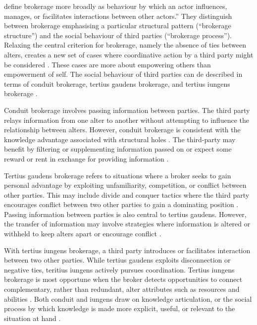 \citet{obstfeld2014brokerage} define brokerage more broadly as behaviour by which an actor influences, manages, or facilitates interactions between other actors.” They distinguish between brokerage emphasising a particular structural pattern (“brokerage structure”) and the social behaviour of third parties (“brokerage process”). Relaxing the central criterion for brokerage, namely the absence of ties between alters, creates a new set of cases where coordinative action by a third party might be considered \citep{obstfeld2014brokerage}. These cases are more about empowering others than empowerment of self. The social behaviour of third parties can de described in terms of conduit brokerage, tertius gaudens brokerage, and tertius iungens brokerage \citep{obstfeld2014brokerage}.\medskip

Conduit brokerage involves passing information between parties. The third party relays information from one alter to another without attempting to influence the relationship between alters. However, conduit brokerage is consistent with the knowledge advantage associated with structural holes \citep{burt1992structural}. The third-party may benefit by filtering or supplementing information passed on or expect some reward or rent in exchange for providing information \citep{obstfeld2014brokerage}. \medskip

Tertius gaudens brokerage refers to situations where a broker seeks to gain personal advantage by exploiting unfamiliarity, competition, or conflict between other parties. This may include divide and conquer tactics where the third party encourages conflict between two other parties to gain a dominating position \citep{simmel1950sociology,burt1992structural,obstfeld2014brokerage}. Passing information between parties is also central to tertius gaudens. However, the transfer of information may involve strategies where information is altered or withheld to keep alters apart or encourage conflict \citep{obstfeld2014brokerage}.\medskip

With tertius iungens brokerage, a third party introduces or facilitates interaction between two other parties. While tertius gaudens exploits disconnection or negative ties, teritius iungens actively pursues coordination. Tertius iungens brokerage is most opportune when the broker detects opportunities to connect complementary, rather than redundant, alter attributes such as resources and abilities \citep{obstfeld2014brokerage}. Both conduit and iungens draw on knowledge articulation, or the social process by which knowledge is made more explicit, useful, or relevant to the situation at hand \citep{obstfeld2005social,obstfeld2011saying,obstfeld2012creative}.\medskip

